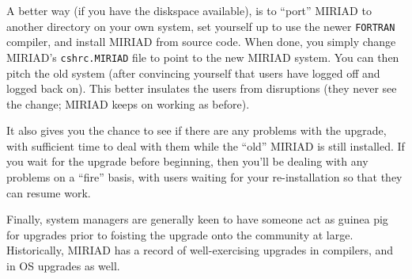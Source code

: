 A better way (if you have the diskspace available), is to ``port'' MIRIAD
to another directory on your own system, set yourself up to use the newer
{\tt FORTRAN} compiler, and install MIRIAD from source code.  When done,
you simply change MIRIAD's {\tt cshrc.MIRIAD} file to point to the new
MIRIAD system.  You can then pitch the old system (after convincing
yourself that users have logged off and logged back on).  This better 
insulates the users from disruptions (they never see the change; MIRIAD
keeps on working as before).

It also gives you the chance to see if there are any problems with the
upgrade, with sufficient time to deal with them while the ``old'' MIRIAD
is still installed.  If you wait for the upgrade before beginning, then
you'll be dealing with any problems on a ``fire'' basis, with users 
waiting for your re-installation so that they can resume work.

Finally, system managers are generally keen to have someone act as guinea
pig for upgrades prior to foisting the upgrade onto the community at
large.  Historically, MIRIAD has a record of well-exercising upgrades in
compilers, and in OS upgrades as well.
